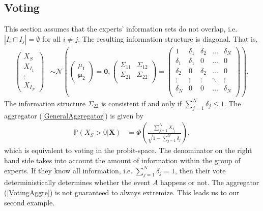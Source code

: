 \documentclass[11pt,twoside]{article}
\renewcommand{\P}{\mathbb{P}}
\begin{document}
\subsection{Voting}
This section assumes that the experts' information sets do not overlap, i.e.   $|I_{i} \cap I_{j}| = \emptyset$ for all $i \neq j$. The resulting information structure is diagonal.  That is,
\begin{align*}
\left(\begin{matrix} X_{S} \\ X_{I_1}\\ \vdots \\ X_{I_N} \end{matrix}\right) &\sim \mathcal{N}\left( \left(\begin{matrix} 
\mu_1 \\ \boldsymbol{\mu}_2
 \end{matrix}\right) =
 \boldsymbol{0}, \left(\begin{matrix} 
\Sigma_{11} & \Sigma_{12}\\
\Sigma_{21} & \Sigma_{22}\\
 \end{matrix}\right) 
 =
 \left(\begin{array}{c|cccc}
1 & \delta_1 & \delta_2 & \dots & \delta_N  \\ \hline
\delta_1 & \delta_1 &0 & \dots & 0   \\ 
\delta_2 & 0 & \delta_2 & \dots & 0  \\ 
\vdots & \vdots & \vdots & \ddots & \vdots  \\ 
\delta_N & 0 & 0 & \dots & \delta_N\\ 
 \end{array}\right)\right),
\end{align*}
The information structure $\Sigma_{22}$ is consistent if and only if $\sum_{j=1}^N \delta_j \leq 1$. The aggregator (\ref{GeneralAggregator}) is given by
\begin{align}
\P\left(X_{S} > 0 | \boldsymbol{X}\right) &= \Phi\left( \frac{\sum_{j=1}^N X_{I_j}}{\sqrt{1 - \sum_{j=1}^N \delta_j}}\right), \label{VotingAggre}
\end{align}
which is equivalent to voting in the probit-space. The denominator on the right hand side takes into account  the amount of information within the group of experts. If they know all information, i.e. $\sum_{j=1}^N \delta_j = 1$, then their vote deterministically determines whether the event $A$ happens or not. The aggregator (\ref{VotingAggre}) is not guaranteed to always extremize. This leads us to our second example. 
\end{document}
